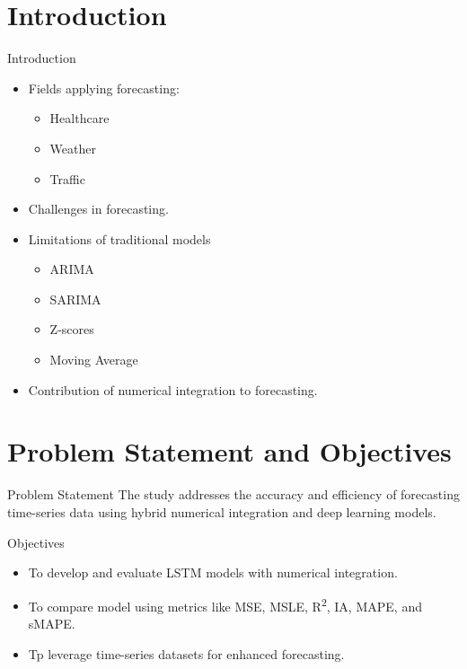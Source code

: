 \documentclass[10pt]{beamer}
\begin{document}
\section{Introduction}
\begin{frame}{Introduction}
    \begin{itemize}
        \item Fields applying forecasting: 
        \begin{itemize}
            \item Healthcare
            \item Weather
            \item Traffic
        \end{itemize}
        \item Challenges in forecasting.
        \item Limitations of traditional models 
        \begin{itemize}
            \item ARIMA
            \item SARIMA 
            \item Z-scores
            \item Moving Average
        \end{itemize}
        \item Contribution of numerical integration to forecasting.
    \end{itemize}
\end{frame}

\section{Problem Statement and Objectives}
\begin{frame}{Problem Statement}
    The study addresses the accuracy and efficiency of forecasting time-series data using hybrid numerical integration and deep learning models.
\end{frame}

\begin{frame}{Objectives}
    \begin{itemize}
        \item To develop and evaluate LSTM models with numerical integration.
        \item To compare model using metrics like MSE, MSLE, R\textsuperscript{2}, IA, MAPE, and sMAPE.
        \item Tp leverage time-series datasets for enhanced forecasting.
    \end{itemize}
\end{frame}
\end{document}
